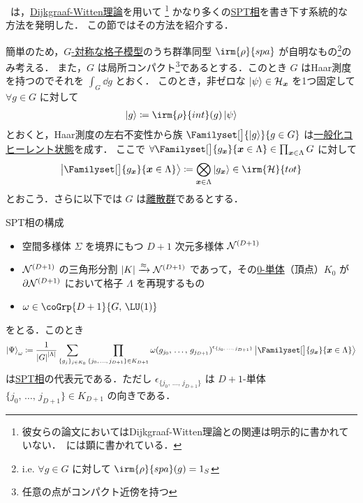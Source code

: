 \documentclass[TQFT_main]{subfiles}
\begin{document}
~\cite[p.16, VIII]{ChenGuLiuWen2013}は，\hyperref[def:Dijkgraaf-Witten]{Dijkgraaf-Witten理論}を用いて
\footnote{彼女らの論文においてはDijkgraaf-Witten理論との関連は明示的に書かれていない．~\cite{Wen2014SPT}には顕に書かれている．}
かなり多くの\hyperref[def:SPT-traditional]{SPT相}を書き下す系統的な方法を発明した．
この節ではその方法を紹介する．

簡単のため，\hyperref[def:Gequiv-bqp]{$G$-対称な格子模型}のうち群準同型 $\irm{\rho}{spa}$ が自明なもの\footnote{i.e. $\forall g \in G$ に対して $\irm{\rho}{spa}(g) = 1_S$}のみ考える．
また，$G$ は局所コンパクト\footnote{任意の点がコンパクト近傍を持つ}であるとする．このとき $G$ はHaar測度を持つのでそれを $\int_G \dd{g}$ とおく．
このとき，非ゼロな $\ket{\psi} \in \mathcal{H}_{\bm{x}}$ を1つ固定して $\forall g \in G$ に対して
\begin{align}
    \ket{g} \coloneqq \irm{\rho}{int}(g) \ket{\psi}
\end{align}
とおくと，Haar測度の左右不変性から族 $\Familyset[\big]{\ket{g}}{g \in G}$ は\href{https://en.wikipedia.org/wiki/Coherent_states_in_mathematical_physics}{一般化コヒーレント状態}を成す．
ここで $\forall \Familyset[\big]{g_{\bm{x}}}{\bm{x} \in \Lambda} \in \prod_{\bm{x} \in \Lambda} G$ に対して
\begin{align}
    \ket{\Familyset[\big]{g_{\bm{x}}}{\bm{x} \in \Lambda}} \coloneqq \bigotimes_{\bm{x} \in \Lambda} \ket{g_{\bm{x}}} \in \irm{\mathcal{H}}{tot}
\end{align}
とおこう．さらに以下では $G$ は\underline{離散群}であるとする．

\begin{myprop}[label=prop:SPT-CGLW]{SPT相の構成}
    \begin{itemize}
        \item 空間多様体 $\Sigma$ を境界にもつ $D+1$ 次元多様体 $\mathcal{N}^{(D+1)}$ 
        \item $\mathcal{N}^{(D+1)}$ の三角形分割 $\abs{K} \xrightarrow{\approx} \mathcal{N}^{(D+1)}$ であって，その\hyperref[def:SimpSet]{0-単体}（頂点）$K_0$ が $\partial \mathcal{N}^{(D+1)}$ において格子 $\Lambda$ を再現するもの
        \item $\omega \in \coGrp{D+1}{G,\, \LU(1)}$
    \end{itemize}
    をとる．このとき
    \begin{align}
        \ket{\Psi}_\omega \coloneqq \frac{1}{\abs{G}^{\abs{\Lambda}}} \sum_{\{g_{j}\}_{j \in K_0}} \prod_{\{j_0,\, \dots,\, j_{D+1}\} \in K_{D+1}} \omega (g_{j_0},\, \dots,\, g_{j_{D+1}})^{\epsilon_{\{j_0,\, \dots,\, j_{D+1}\}}} \ket{\Familyset[\big]{g_{\bm{x}}}{\bm{x} \in \Lambda}}
    \end{align}
    は\hyperref[def:SPT-traditional]{SPT相}の代表元である．ただし $\epsilon_{\{j_0,\, \dots,\, j_{D+1}\}}$ は $D+1$-単体 $\{j_0,\, \dots,\, j_{D+1}\} \in K_{D+1}$ の向きである．
\end{myprop}
\end{document}
